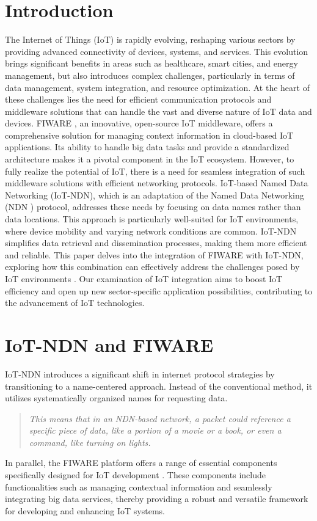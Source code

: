 \documentclass[conference]{IEEEtran}
\begin{document}
\section{Introduction}
The Internet of Things (IoT) is rapidly evolving, reshaping various sectors by providing advanced connectivity of devices, systems, and services. \cite[Alam, 2018]{b1}
This evolution brings significant benefits in areas such as healthcare, smart cities, and energy management, but also introduces complex challenges, particularly in terms of data management, system integration, and resource optimization.
At the heart of these challenges lies the need for efficient communication protocols and middleware solutions that can handle the vast and diverse nature of IoT data and devices.
FIWARE \cite[FIWARE Foundation]{b2}, an innovative, open-source IoT middleware, offers a comprehensive solution for managing context information in cloud-based IoT applications.
Its ability to handle big data tasks and provide a standardized architecture makes it a pivotal component in the IoT ecosystem.
However, to fully realize the potential of IoT, there is a need for seamless integration of such middleware solutions with efficient networking protocols.
IoT-based Named Data Networking (IoT-NDN), which is an adaptation of the Named Data Networking (NDN \cite[Zhang]{b7}) protocol, addresses these needs by focusing on data names rather than data locations.
This approach is particularly well-suited for IoT environments, where device mobility and varying network conditions are common. IoT-NDN simplifies data retrieval and dissemination processes, making them more efficient and reliable.
This paper delves into the integration of FIWARE with IoT-NDN, exploring how this combination can effectively address the challenges posed by IoT environments \cite[Sheng]{b6}.
Our examination of IoT integration aims to boost IoT efficiency and open up new sector-specific application possibilities, contributing to the advancement of IoT technologies.


\section{IoT-NDN and FIWARE}
IoT-NDN introduces a significant shift in internet protocol strategies by transitioning to a name-centered approach.
Instead of the conventional method, it utilizes systematically organized names for requesting data.
\begin{quote}
    \textit{This means that in an NDN-based network, a packet could reference a specific piece of data, like a portion of a movie or a book, or even a command, like turning on lights.} \cite[NDN Project]{b8}
\end{quote}
In parallel, the FIWARE platform offers a range of essential components specifically designed for IoT development \cite[FIWARE Foundation]{b2}.
These components include functionalities such as managing contextual information and seamlessly integrating big data services, thereby providing a robust and versatile framework for developing and enhancing IoT systems.
\end{document}
